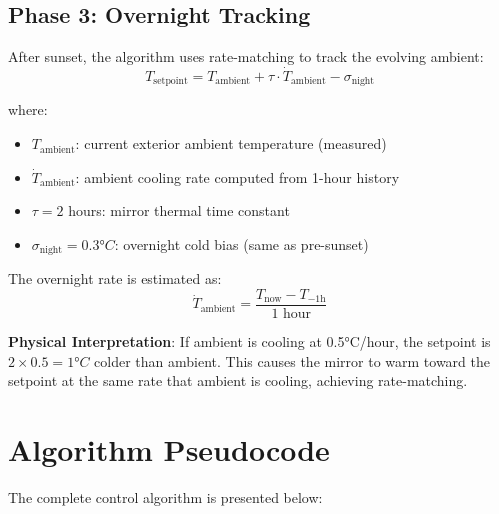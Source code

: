\documentclass[11pt,letterpaper]{article}
\begin{document}
\subsection{Phase 3: Overnight Tracking}

After sunset, the algorithm uses rate-matching to track the evolving ambient:
\begin{equation}
    \boxed{T_\text{setpoint} = T_\text{ambient} + \tau \cdot \dot{T}_\text{ambient} - \sigma_\text{night}}
    \label{eq:overnight}
\end{equation}

where:
\begin{itemize}
    \item $T_\text{ambient}$: current exterior ambient temperature (measured)
    \item $\dot{T}_\text{ambient}$: ambient cooling rate computed from 1-hour history
    \item $\tau = 2$ hours: mirror thermal time constant
    \item $\sigma_\text{night} = 0.3°C$: overnight cold bias (same as pre-sunset)
\end{itemize}

The overnight rate is estimated as:
\begin{equation}
    \dot{T}_\text{ambient} = \frac{T_\text{now} - T_{-1\text{h}}}{1\text{ hour}}
\end{equation}

\textbf{Physical Interpretation}: If ambient is cooling at 0.5°C/hour, the setpoint is $2 \times 0.5 = 1°C$ colder than ambient. This causes the mirror to warm toward the setpoint at the same rate that ambient is cooling, achieving rate-matching.

\section{Algorithm Pseudocode}

The complete control algorithm is presented below:
\end{document}
